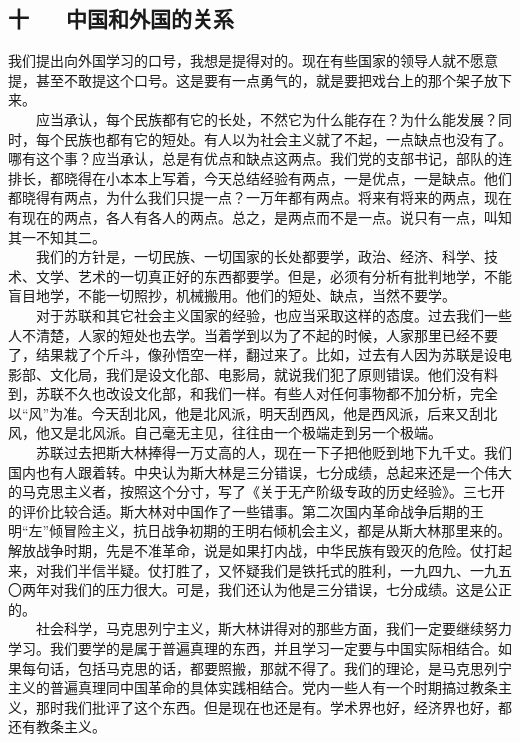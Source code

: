 \documentclass[cn,11pt,chinese]{elegantbook}
\def\myformat#1{\hfil\hfil #1}
\begin{document}
\subsection*{\myformat{十 　  中国和外国的关系}}
我们提出向外国学习的口号，我想是提得对的。现在有些国家的领导人就不愿意提，甚至不敢提这个口号。这是要有一点勇气的，就是要把戏台上的那个架子放下来。\\
　　应当承认，每个民族都有它的长处，不然它为什么能存在？为什么能发展？同时，每个民族也都有它的短处。有人以为社会主义就了不起，一点缺点也没有了。哪有这个事？应当承认，总是有优点和缺点这两点。我们党的支部书记，部队的连排长，都晓得在小本本上写着，今天总结经验有两点，一是优点，一是缺点。他们都晓得有两点，为什么我们只提一点？一万年都有两点。将来有将来的两点，现在有现在的两点，各人有各人的两点。总之，是两点而不是一点。说只有一点，叫知其一不知其二。\\
　　我们的方针是，一切民族、一切国家的长处都要学，政治、经济、科学、技术、文学、艺术的一切真正好的东西都要学。但是，必须有分析有批判地学，不能盲目地学，不能一切照抄，机械搬用。他们的短处、缺点，当然不要学。\\
　　对于苏联和其它社会主义国家的经验，也应当采取这样的态度。过去我们一些人不清楚，人家的短处也去学。当着学到以为了不起的时候，人家那里已经不要了，结果栽了个斤斗，像孙悟空一样，翻过来了。比如，过去有人因为苏联是设电影部、文化局，我们是设文化部、电影局，就说我们犯了原则错误。他们没有料到，苏联不久也改设文化部，和我们一样。有些人对任何事物都不加分析，完全以“风”为准。今天刮北风，他是北风派，明天刮西风，他是西风派，后来又刮北风，他又是北风派。自己毫无主见，往往由一个极端走到另一个极端。\\
　　苏联过去把斯大林捧得一万丈高的人，现在一下子把他贬到地下九千丈。我们国内也有人跟着转。中央认为斯大林是三分错误，七分成绩，总起来还是一个伟大的马克思主义者，按照这个分寸，写了《关于无产阶级专政的历史经验》。三七开的评价比较合适。斯大林对中国作了一些错事。第二次国内革命战争后期的王明“左”倾冒险主义，抗日战争初期的王明右倾机会主义，都是从斯大林那里来的。解放战争时期，先是不准革命，说是如果打内战，中华民族有毁灭的危险。仗打起来，对我们半信半疑。仗打胜了，又怀疑我们是铁托式的胜利，一九四九、一九五〇两年对我们的压力很大。可是，我们还认为他是三分错误，七分成绩。这是公正的。\\
　　社会科学，马克思列宁主义，斯大林讲得对的那些方面，我们一定要继续努力学习。我们要学的是属于普遍真理的东西，并且学习一定要与中国实际相结合。如果每句话，包括马克思的话，都要照搬，那就不得了。我们的理论，是马克思列宁主义的普遍真理同中国革命的具体实践相结合。党内一些人有一个时期搞过教条主义，那时我们批评了这个东西。但是现在也还是有。学术界也好，经济界也好，都还有教条主义。\\
\end{document}
